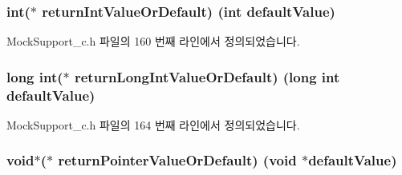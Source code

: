 \subsubsection[{\texorpdfstring{return\+Int\+Value\+Or\+Default}{returnIntValueOrDefault}}]{\setlength{\rightskip}{0pt plus 5cm}int($\ast$ return\+Int\+Value\+Or\+Default) (int default\+Value)}\hypertarget{struct_s_mock_support__c_a781e904090c1ca3ec3b5cf085a10e2bc}{}\label{struct_s_mock_support__c_a781e904090c1ca3ec3b5cf085a10e2bc}


Mock\+Support\+\_\+c.\+h 파일의 160 번째 라인에서 정의되었습니다.

\subsubsection[{\texorpdfstring{return\+Long\+Int\+Value\+Or\+Default}{returnLongIntValueOrDefault}}]{\setlength{\rightskip}{0pt plus 5cm}long int($\ast$ return\+Long\+Int\+Value\+Or\+Default) (long int default\+Value)}\hypertarget{struct_s_mock_support__c_a70a97eb5b9ca3623f7ae131d427932f3}{}\label{struct_s_mock_support__c_a70a97eb5b9ca3623f7ae131d427932f3}


Mock\+Support\+\_\+c.\+h 파일의 164 번째 라인에서 정의되었습니다.

\subsubsection[{\texorpdfstring{return\+Pointer\+Value\+Or\+Default}{returnPointerValueOrDefault}}]{\setlength{\rightskip}{0pt plus 5cm}void$\ast$($\ast$ return\+Pointer\+Value\+Or\+Default) (void $\ast$default\+Value)}\hypertarget{struct_s_mock_support__c_a5ea57c5c895836ca7b36211167811712}{}\label{struct_s_mock_support__c_a5ea57c5c895836ca7b36211167811712}


